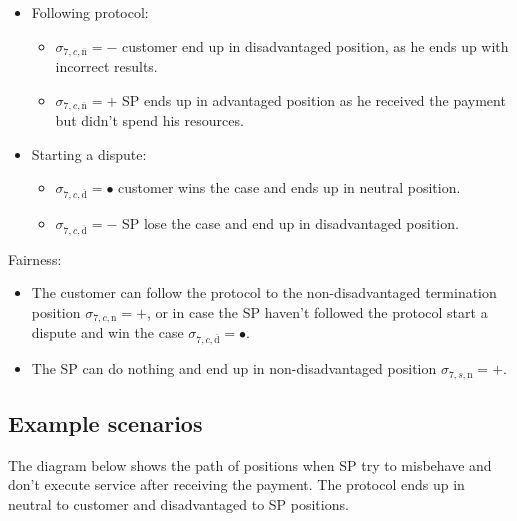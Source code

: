 \documentclass{ieeeaccess}
\begin{document}
\begin{itemize}
\item
  Following protocol:

  \begin{itemize}
  
  \item
    \(\sigma_{7, c, \overline{\mathrm{n}}} = -\) customer end up in disadvantaged position, as he ends up with incorrect results.
  \item
    \(\sigma_{7, c, \overline{\mathrm{n}}} = +\) SP ends up in advantaged
    position as he received the payment but didn't spend his resources.
  \end{itemize}
\item
  Starting a dispute:

  \begin{itemize}
  
  \item
    \(\sigma_{7, c, \overline{\mathrm{d}}} = •\) customer wins the case and ends up in neutral position.
  \item
    \(\sigma_{7, c, \overline{\mathrm{d}}} = -\) SP lose the case and end up in disadvantaged position.
  \end{itemize}
\end{itemize}

Fairness:

\begin{itemize}

\item
  The customer can follow the protocol to the non-disadvantaged termination position \(\sigma_{7, c, \mathrm{n}} = +\), or in case the SP haven't followed the protocol start a dispute and win the case \(\sigma_{7, c, \overline{\mathrm{d}}} = •\).
\item
  The SP can do nothing and end up in non-disadvantaged position \(\sigma_{7, s, \mathrm{n}} = +\).
\end{itemize}

\subsection{Example scenarios}\label{example-scenarios}

The diagram below shows the path of positions when SP try to misbehave and don't execute service after receiving the payment. The protocol ends up in neutral to customer and disadvantaged to SP positions.
\end{document}
